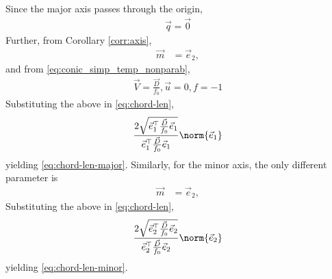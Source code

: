 
		\label{app:major}
		Since the major axis passes through the origin, 
  \begin{align}
	  \vec{q} =			\vec{0} 
\end{align}  
Further, from Corollary  
		\eqref{corr:axis},
  \begin{align}
  \vec{m}&= \vec{e}_2,  
\end{align} and
from 
    \eqref{eq:conic_simp_temp_nonparab},
  \begin{align}
	  \vec{V} =     \frac{\vec{D} }{f_0}, 
	   \vec{u} = 0, 
	   f = -1
	    \label{eq:latus_rectum_ellipse_param}
\end{align}  
Substituting the above in
\eqref{eq:chord-len}, 
\begin{align}
 \frac{2\sqrt{
\vec{e}_1^{\top}\frac{\vec{D}}{f_0}\vec{e}_1
}
}
{
\vec{e}_1^{\top}\frac{\vec{D}}{f_0}\vec{e}_1
}\norm{\vec{e}_1}
  \end{align}
  yielding 
\eqref{eq:chord-len-major}.
Similarly, for the minor axis, the only different parameter is 
  \begin{align}
  \vec{m}&= \vec{e}_2,  
\end{align} 
Substituting the above in
\eqref{eq:chord-len}, 
\begin{align}
 \frac{2\sqrt{
\vec{e}_2^{\top}\frac{\vec{D}}{f_0}\vec{e}_2
}
}
{
\vec{e}_2^{\top}\frac{\vec{D}}{f_0}\vec{e}_2
}\norm{\vec{e}_2}
  \end{align}
  yielding 
\eqref{eq:chord-len-minor}.
